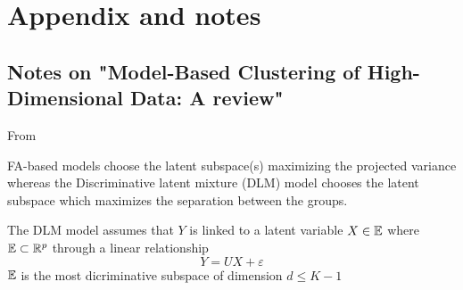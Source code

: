 \chapter{Appendix and notes}\label{appendix_notes}

\section{Notes on "Model-Based Clustering of High- Dimensional Data: A review"}
From \cite{bouveyron:hal-00750909}\\
\begin{displayquote}
FA-based models choose the latent subspace(s) maximizing the projected variance whereas the Discriminative latent mixture (DLM) model chooses the latent subspace which maximizes the separation between the groups.
\end{displayquote}
The DLM model assumes that $Y$ is linked to a latent variable $X\in{\mathbb E}$ where ${\mathbb E}\subset{\mathbb R}^p$ through a linear relationship
\begin{equation}
	Y = UX + \varepsilon
\end{equation}
${\mathbb E}$ is the most dicriminative subspace of dimension $d\leq K-1$

